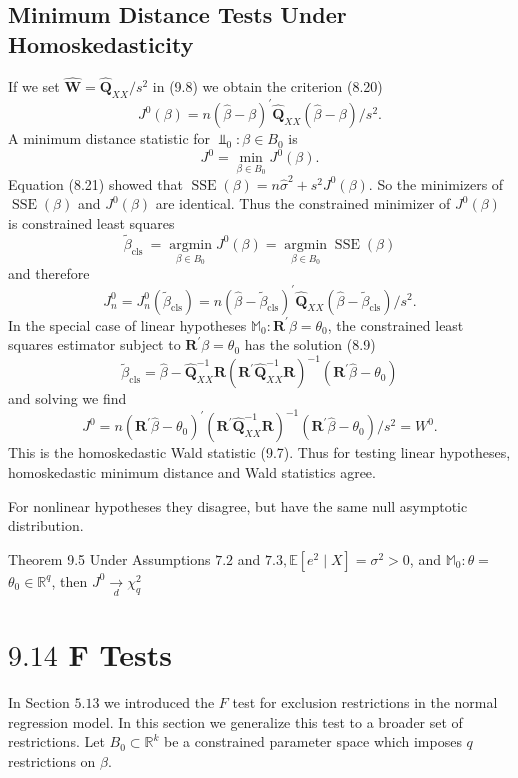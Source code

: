 \documentclass[10pt]{article}
\begin{document}
\subsection{Minimum Distance Tests Under Homoskedasticity}
If we set $\widehat{\boldsymbol{W}}=\widehat{\boldsymbol{Q}}_{X X} / s^{2}$ in (9.8) we obtain the criterion (8.20)
$$
J^{0}(\beta)=n(\widehat{\beta}-\beta)^{\prime} \widehat{\boldsymbol{Q}}_{X X}(\widehat{\beta}-\beta) / s^{2} .
$$
A minimum distance statistic for $\mathbb{\Perp}_{0}: \beta \in B_{0}$ is
$$
J^{0}=\min _{\beta \in B_{0}} J^{0}(\beta) .
$$
Equation (8.21) showed that $\operatorname{SSE}(\beta)=n \widehat{\sigma}^{2}+s^{2} J^{0}(\beta)$. So the minimizers of $\operatorname{SSE}(\beta)$ and $J^{0}(\beta)$ are identical. Thus the constrained minimizer of $J^{0}(\beta)$ is constrained least squares
$$
\widetilde{\beta}_{\text {cls }}=\underset{\beta \in B_{0}}{\operatorname{argmin}} J^{0}(\beta)=\underset{\beta \in B_{0}}{\operatorname{argmin}} \operatorname{SSE}(\beta)
$$
and therefore
$$
J_{n}^{0}=J_{n}^{0}\left(\widetilde{\beta}_{\mathrm{cls}}\right)=n\left(\widehat{\beta}-\widetilde{\beta}_{\mathrm{cls}}\right)^{\prime} \widehat{\boldsymbol{Q}}_{X X}\left(\widehat{\beta}-\widetilde{\beta}_{\mathrm{cls}}\right) / s^{2} .
$$
In the special case of linear hypotheses $\mathbb{M}_{0}: \boldsymbol{R}^{\prime} \beta=\theta_{0}$, the constrained least squares estimator subject to $\boldsymbol{R}^{\prime} \beta=\theta_{0}$ has the solution (8.9)
$$
\widetilde{\beta}_{\mathrm{cls}}=\widehat{\beta}-\widehat{\boldsymbol{Q}}_{X X}^{-1} \boldsymbol{R}\left(\boldsymbol{R}^{\prime} \widehat{\boldsymbol{Q}}_{X X}^{-1} \boldsymbol{R}\right)^{-1}\left(\boldsymbol{R}^{\prime} \widehat{\beta}-\theta_{0}\right)
$$
and solving we find
$$
J^{0}=n\left(\boldsymbol{R}^{\prime} \widehat{\beta}-\theta_{0}\right)^{\prime}\left(\boldsymbol{R}^{\prime} \widehat{\boldsymbol{Q}}_{X X}^{-1} \boldsymbol{R}\right)^{-1}\left(\boldsymbol{R}^{\prime} \widehat{\beta}-\theta_{0}\right) / s^{2}=W^{0} .
$$
This is the homoskedastic Wald statistic (9.7). Thus for testing linear hypotheses, homoskedastic minimum distance and Wald statistics agree.

For nonlinear hypotheses they disagree, but have the same null asymptotic distribution.

Theorem 9.5 Under Assumptions $7.2$ and $7.3, \mathbb{E}\left[e^{2} \mid X\right]=\sigma^{2}>0$, and $\mathbb{M}_{0}: \theta=$ $\theta_{0} \in \mathbb{R}^{q}$, then $J^{0} \underset{d}{\longrightarrow} \chi_{q}^{2}$

\section{$9.14$ F Tests}
In Section $5.13$ we introduced the $F$ test for exclusion restrictions in the normal regression model. In this section we generalize this test to a broader set of restrictions. Let $B_{0} \subset \mathbb{R}^{k}$ be a constrained parameter space which imposes $q$ restrictions on $\beta$.
\end{document}
